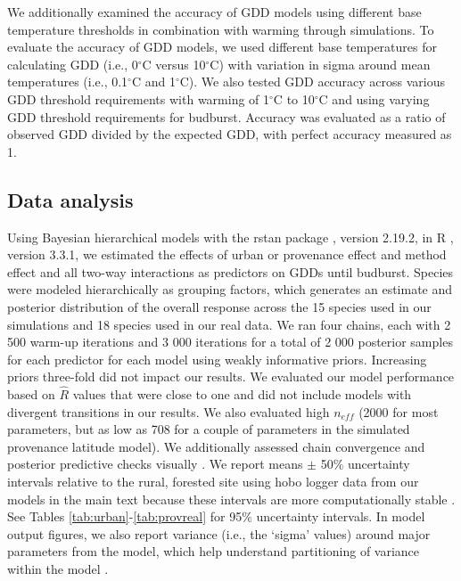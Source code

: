 \documentclass{article}\usepackage[]{graphicx}\usepackage[]{color}
\begin{document}
We additionally examined the accuracy of GDD models using different base temperature thresholds in combination with warming through simulations. To evaluate the accuracy of GDD models, we used different base temperatures for calculating GDD (i.e., 0$^{\circ}$C versus 10$^{\circ}$C) with variation in sigma around mean temperatures (i.e., 0.1$^{\circ}$C and 1$^{\circ}$C). We also tested GDD accuracy across various GDD threshold requirements with warming of 1$^{\circ}$C to 10$^{\circ}$C and using varying GDD threshold requirements for budburst. Accuracy was evaluated as a ratio of observed GDD divided by the expected GDD, with perfect accuracy measured as 1.

\subsection*{Data analysis}
Using Bayesian hierarchical models with the rstan package \citep{rstan2019}, version 2.19.2,  in R \citep{R}, version 3.3.1, we estimated the effects of urban or provenance effect and method effect and all two-way interactions as predictors on GDDs until budburst. Species were modeled hierarchically as grouping factors, which generates an estimate and posterior distribution of the overall response across the 15 species used in our simulations and 18 species used in our real data. We ran four chains, each with 2 500 warm-up iterations and 3 000 iterations for a total of 2 000 posterior samples for each predictor for each model using weakly informative priors. Increasing priors three-fold did not impact our results. We evaluated our model performance based on $\hat{R}$ values that were close to one and did not include models with divergent transitions in our results. We also evaluated high $n_{eff}$ (2000 for most parameters, but as low as 708 for a couple of parameters in the simulated provenance latitude model). We additionally assessed chain convergence and posterior predictive checks visually \citep{BDA}. We report means $\pm$ 50\% uncertainty intervals relative to the rural, forested site using hobo logger data from our models in the main text because these intervals are more computationally stable \citep{Carpenter2017,BDA}. See Tables \ref{tab:urban}-\ref{tab:provreal} for 95\% uncertainty intervals. In model output figures, we also report variance (i.e., the `sigma' values) around major parameters from the model, which help understand partitioning of variance within the model \citep{BDA}. 
\end{document}
